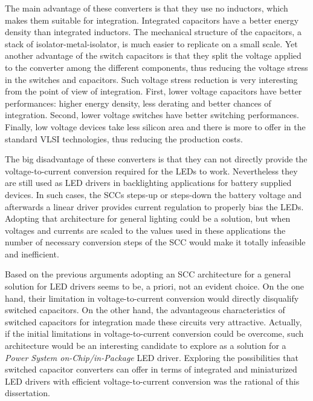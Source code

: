 The main advantage of these converters is that they use no inductors, which makes them suitable for integration. Integrated capacitors have a better energy density than integrated inductors. The mechanical structure of the capacitors, a stack of isolator-metal-isolator, is much easier to replicate on a small scale. Yet another advantage of the switch capacitors is that they split the voltage applied to the converter among the different components, thus reducing the voltage stress in the switches and capacitors. Such voltage stress reduction is very interesting from the point of view of integration. First, lower voltage capacitors have better performances: higher energy density, less derating and better chances of integration. Second, lower voltage switches have better switching performances. Finally, low voltage devices take less silicon area and there is more to offer in the standard VLSI technologies, thus reducing the production costs.

The big disadvantage of these converters is that they can not directly provide the voltage-to-current conversion required for the LEDs to work. Nevertheless they are still used as LED drivers in backlighting applications for battery supplied devices. In such cases, the SCCs steps-up or steps-down the battery voltage and afterwards a linear driver  provides current regulation to properly bias the LEDs. Adopting that architecture for general lighting could be a solution, but when  voltages and currents are scaled to the values used in these applications the number of necessary conversion steps of the SCC would make it totally infeasible and inefficient.

Based on the previous arguments adopting an SCC architecture for a general solution for LED drivers seems to be, a priori,  not an evident choice. On the one hand, their limitation in voltage-to-current conversion would directly disqualify switched capacitors. On the other hand, the advantageous characteristics of switched capacitors for integration made these circuits very attractive. Actually, if the initial limitations in voltage-to-current conversion could be overcome, such architecture would be an interesting candidate to explore as a solution for a \emph{Power System on-Chip/in-Package} LED driver.  Exploring the possibilities that switched capacitor converters can offer in terms of integrated and miniaturized LED drivers with efficient voltage-to-current conversion was the rational of this dissertation.

